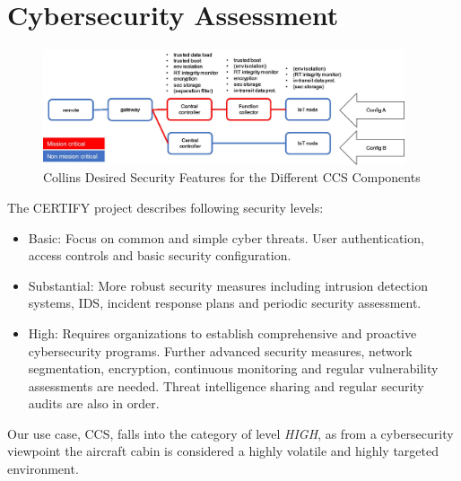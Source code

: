 
\section{Cybersecurity Assessment} %
\label{sec:Cybersecurity Assessment}

\begin{figure}
	\begin{center}
		\includegraphics[width=0.95\textwidth]{figures/collins-sec-feat.jpg}
	\end{center}
	\caption{Collins Desired Security Features for the Different CCS Components}
	\label{fig:collins-sec-feat}
\end{figure}

The CERTIFY \cite{certifyproject2023} project describes following security levels:

\begin{itemize}
	\item Basic: Focus on common and simple cyber threats. User authentication, access controls and basic security
	      configuration.
	\item Substantial: More robust security measures including intrusion detection systems, IDS, incident response
	      plans and periodic security assessment.
	\item High: Requires organizations to establish comprehensive and proactive cybersecurity programs. Further
	      advanced security measures, network segmentation, encryption, continuous monitoring and regular
	      vulnerability assessments are needed. Threat intelligence sharing and regular security audits are also in
	      order.
\end{itemize}

Our use case, CCS, falls into the category of level \textit{HIGH}, as from a cybersecurity viewpoint the aircraft cabin
is considered a highly volatile and highly targeted environment.

